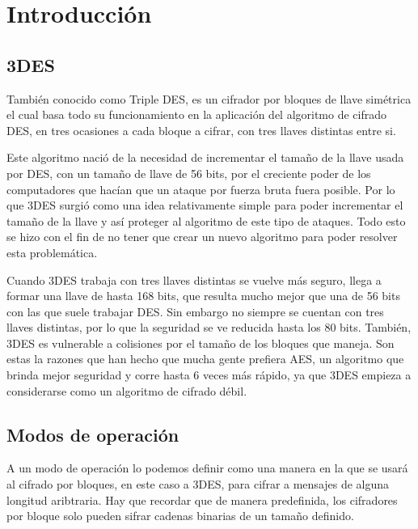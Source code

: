 \documentclass[10pt]{article}
\begin{document}
\newpage																		

\newpage

\section{Introducción}
   \subsection{3DES}
      También conocido como Triple DES, es un cifrador por bloques de llave simétrica el cual basa todo su funcionamiento en la aplicación del algoritmo de cifrado DES, en tres ocasiones a cada bloque a cifrar, con tres llaves distintas entre si.

      Este algoritmo nació de la necesidad de incrementar el tamaño de la llave usada por DES, con un tamaño de llave de 56 bits, por el creciente poder de los computadores que hacían que un ataque por fuerza bruta fuera posible. Por lo que 3DES surgió como una idea relativamente simple para poder incrementar el tamaño de la llave y así proteger al algoritmo de este tipo de ataques. Todo esto se hizo con el fin de no tener que crear un nuevo algoritmo para poder resolver esta problemática.

      Cuando 3DES trabaja con tres llaves distintas se vuelve más seguro, llega a formar una llave de hasta 168 bits, que resulta mucho mejor que una de 56 bits con las que suele trabajar DES. Sin embargo no siempre se cuentan con tres llaves distintas, por lo que la seguridad se ve reducida hasta los 80 bits. También, 3DES es vulnerable a colisiones por el tamaño de los bloques que maneja. Son estas la razones que han hecho que mucha gente prefiera AES, un algoritmo que brinda mejor seguridad y corre hasta 6 veces más rápido, ya que 3DES empieza a considerarse como un algoritmo de cifrado débil.

   \subsection{Modos de operación}
      A un modo de operación lo podemos definir como una manera en la que se usará al cifrado por bloques, en este caso a 3DES, para cifrar a mensajes de alguna longitud aribtraria. Hay que recordar que de manera predefinida, los cifradores por bloque solo pueden sifrar cadenas binarias de un tamaño definido. 
\end{document}
